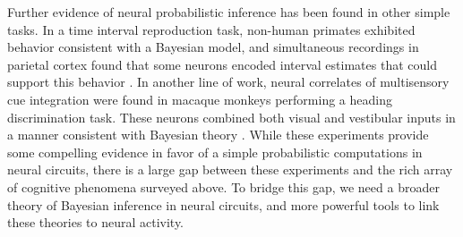 Further evidence of neural probabilistic inference has been found in
other simple tasks. In a time interval reproduction task, non-human
primates exhibited behavior consistent with a Bayesian model, and
simultaneous recordings in parietal cortex found that some neurons
encoded interval estimates that could support this behavior
\citep{jazayeri2015neural}. In another line of work, neural correlates
of multisensory cue integration were found in macaque monkeys
performing a heading discrimination task. These neurons combined both
visual and vestibular inputs in a manner consistent with Bayesian
theory \citep{gu2008neural, morgan2008multisensory, fetsch2009dynamic,
  fetsch2012neural}.  While these experiments provide some compelling
evidence in favor of a simple probabilistic computations in neural
circuits, there is a large gap between these experiments and the rich
array of cognitive phenomena surveyed above. To bridge this gap, we
need a broader theory of Bayesian inference in neural circuits, and
more powerful tools to link these theories to neural activity.


